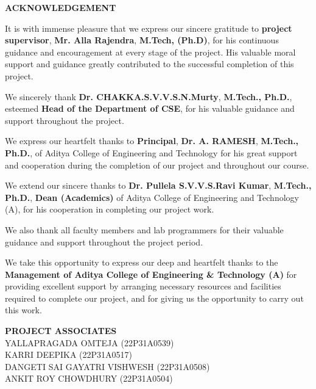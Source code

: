 \begin{center}
{\bfseries\fontsize{16}{18}\selectfont ACKNOWLEDGEMENT}
\end{center}

\vspace{0.5cm}
\noindent
It is with immense pleasure that we express our sincere gratitude to \textbf{project supervisor},
\textbf{Mr. Alla Rajendra}, {\scriptsize \textbf{M.Tech, (Ph.D)}}, for his continuous guidance and encouragement at every stage of the project.
His valuable moral support and guidance greatly contributed to the successful completion of this project.

\vspace{0.3cm}

\noindent
We sincerely thank \textbf{Dr. CHAKKA.S.V.V.S.N.Murty}, {\scriptsize \textbf{M.Tech., Ph.D.}}, esteemed \textbf{Head of the Department of CSE},
for his valuable guidance and support throughout the project.

\vspace{0.3cm}

\noindent
We express our heartfelt thanks to \textbf{Principal}, \textbf{Dr. A. RAMESH}, {\scriptsize \textbf{M.Tech., Ph.D.}},
of Aditya College of Engineering and Technology for his great support and cooperation during the completion of our project and throughout our course.

\vspace{0.3cm}

\noindent
We extend our sincere thanks to \textbf{Dr. Pullela S.V.V.S.Ravi Kumar}, {\scriptsize \textbf{M.Tech., Ph.D.}},
\textbf{Dean (Academics)} of Aditya College of Engineering and Technology (A), for his cooperation in completing our project work.

\vspace{0.3cm}

\noindent
We also thank all faculty members and lab programmers for their valuable guidance and support throughout the project period.

\vspace{0.3cm}

\noindent
We take this opportunity to express our deep and heartfelt thanks to the \textbf{Management of Aditya College of Engineering \& Technology (A)}
for providing excellent support by arranging necessary resources and facilities required to complete our project, and for giving us the opportunity to carry out this work.

\vspace{2cm}

\begin{flushright}
\textbf{PROJECT ASSOCIATES}\\[0.5cm]

YALLAPRAGADA OMTEJA (22P31A0539)\\
KARRI DEEPIKA (22P31A0517)\\
DANGETI SAI GAYATRI VISHWESH (22P31A0508)\\
ANKIT ROY CHOWDHURY (22P31A0504)
\end{flushright}